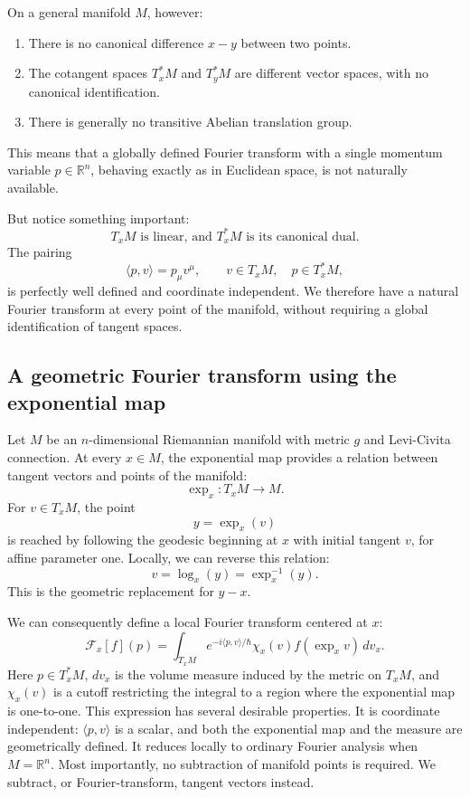 On a general manifold \(M\), however:
\begin{enumerate}
   \item There is no canonical difference \(x-y\) between two points.
   \item The cotangent spaces \(T_x^*M\) and \(T_y^*M\) are different vector
       spaces, with no canonical identification.
   \item There is generally no transitive Abelian translation group.
\end{enumerate}
This means that a globally defined Fourier transform with a single momentum
variable \(p\in\mathbb R^n\), behaving exactly as in Euclidean space, is not
naturally available.

But notice something important:
\[
\boxed{
T_xM\text{ is linear, and }T_x^*M
\text{ is its canonical dual.}
}
\]
The pairing
\[
\langle p,v\rangle=p_\mu v^\mu,
\qquad
v\in T_xM,\quad p\in T_x^*M,
\]
is perfectly well defined and coordinate independent.
We therefore have a natural Fourier transform at every point of the manifold,
without requiring a global identification of tangent spaces.

\subsection{ A geometric Fourier transform using the exponential map}
Let \(M\) be an \(n\)-dimensional Riemannian manifold with metric \(g\) and
Levi-Civita connection.
At every \(x\in M\), the exponential map provides a relation between tangent
vectors and points of the manifold:
\[
\exp_x:T_xM\longrightarrow M.
\]
For \(v\in T_xM\), the point
\[
y=\exp_x(v)
\]
is reached by following the geodesic beginning at \(x\) with initial tangent
\(v\), for affine parameter one.
Locally, we can reverse this relation:
\[
v=\log_x(y)=\exp_x^{-1}(y).
\]
This is the geometric replacement for \(y-x\).

We can consequently define a local Fourier transform centered at \(x\):
\[
\boxed{
\mathcal F_x[f](p)
=
\int_{T_xM}
e^{-i\langle p,v\rangle/\hbar}
\chi_x(v)f(\exp_xv)\,d v_x.
}
\]
Here \(p\in T_x^*M\), \(d v_x\) is the volume measure induced by the metric on
\(T_xM\), and \(\chi_x(v)\) is a cutoff restricting the integral to a region
where the exponential map is one-to-one.
This expression has several desirable properties.
It is coordinate independent: \(\langle p,v\rangle\) is a scalar, and both the
exponential map and the measure are geometrically defined.
It reduces locally to ordinary Fourier analysis when \(M=\mathbb R^n\).
Most importantly, no subtraction of manifold points is required. We subtract,
or Fourier-transform, tangent vectors instead.

